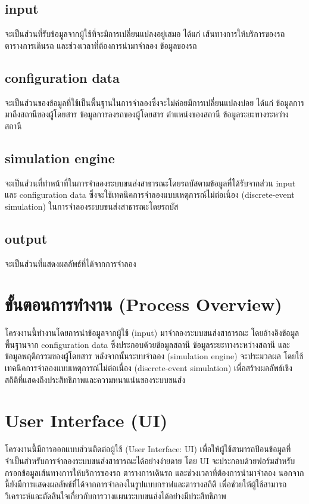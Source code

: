 \subsection{input}
  \indent จะเป็นส่วนที่รับข้อมูลจากผู้ใช้ที่จะมีการเปลี่ยนแปลงอยู่เสมอ ได้แก่ เส้นทางการให้บริการของรถ 
  ตารางการเดินรถ และช่วงเวลาที่ต้องการนำมาจำลอง ข้อมูลของรถ

\subsection{configuration data}
  \indent จะเป็นส่วนของข้อมูลที่ใช้เป็นพื้นฐานในการจำลองซึ่งจะไม่ค่อยมีการเปลี่ยนแปลงบ่อย 
  ได้แก่ ข้อมูลการมาถึงสถานีของผู้โดยสาร ข้อมูลการลงรถของผู้โดยสาร ตำแหน่งของสถานี ข้อมูลระยะทางระหว่างสถานี
  
\subsection{simulation engine}
  \indent จะเป็นส่วนที่ทำหน้าที่ในการจำลองระบบขนส่งสาธารณะโดยรถบัสตามข้อมูลที่ได้รับจากส่วน input 
  และ configuration data ซึ่งจะใช้เทคนิคการจำลองแบบเหตุการณ์ไม่ต่อเนื่อง (discrete-event simulation) 
  ในการจำลองระบบขนส่งสาธารณะโดยรถบัส

\subsection{output}
  \indent จะเป็นส่วนที่แสดงผลลัพธ์ที่ได้จากการจำลอง

\section{ ขั้นตอนการทำงาน (Process Overview)}
\begin{mypara}
    \indent โครงงานนี้ทำงานโดยการนำข้อมูลจากผู้ใช้ (input) มาจำลองระบบขนส่งสาธารณะ 
    โดยอ้างอิงข้อมูลพื้นฐานจาก configuration data ซึ่งประกอบด้วยข้อมูลสถานี ข้อมูลระยะทางระหว่างสถานี 
    และข้อมูลพฤติกรรมของผู้โดยสาร หลังจากนั้นระบบจำลอง (simulation engine) จะประมวลผล 
    โดยใช้เทคนิคการจำลองแบบเหตุการณ์ไม่ต่อเนื่อง (discrete-event simulation) 
    เพื่อสร้างผลลัพธ์เชิงสถิติที่แสดงถึงประสิทธิภาพและความหนาแน่นของระบบขนส่ง 
\end{mypara}

\section{User Interface (UI)}
\begin{mypara}
    \indent โครงงานนี้มีการออกแบบส่วนติดต่อผู้ใช้ (User Interface: UI) 
    เพื่อให้ผู้ใช้สามารถป้อนข้อมูลที่จำเป็นสำหรับการจำลองระบบขนส่งสาธารณะได้อย่างง่ายดาย 
    โดย UI จะประกอบด้วยฟอร์มสำหรับกรอกข้อมูลเส้นทางการให้บริการของรถ ตารางการเดินรถ 
    และช่วงเวลาที่ต้องการนำมาจำลอง นอกจากนี้ยังมีการแสดงผลลัพธ์ที่ได้จากการจำลองในรูปแบบกราฟและตารางสถิติ 
    เพื่อช่วยให้ผู้ใช้สามารถวิเคราะห์และตัดสินใจเกี่ยวกับการวางแผนระบบขนส่งได้อย่างมีประสิทธิภาพ
\end{mypara}

